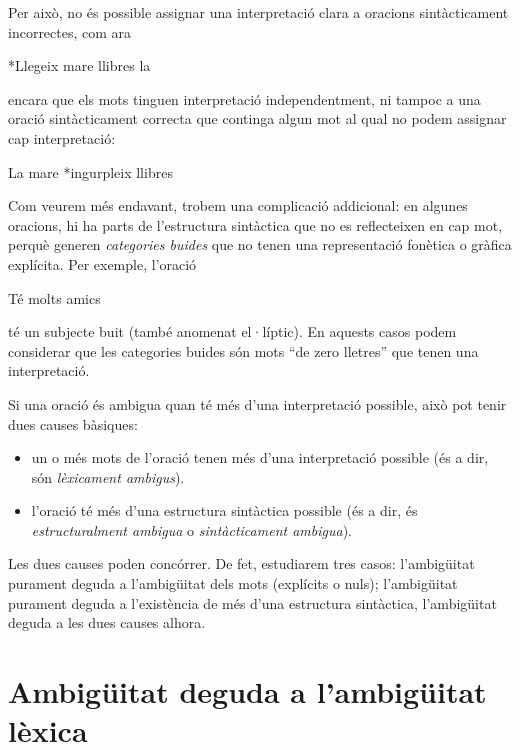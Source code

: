 Per això, no és possible assignar una interpretació clara a oracions
sin\-tàc\-ti\-ca\-ment incorrectes, com ara
\begin{exemple}
*Llegeix mare llibres la
\end{exemple} 
encara que els mots tinguen interpretació independentment, ni
tampoc a una oració sintàcticament correcta que continga algun mot al
qual no podem assignar cap interpretació:
\begin{exemple}
 La mare *ingurpleix llibres
\end{exemple}
Com veurem més endavant, trobem una complicació addicional: en algunes
oracions, hi ha parts de l'estructura sintàctica que no
es reflecteixen en cap mot, perquè generen \emph{categories buides} que
no tenen una representació fonètica o gràfica explícita.  Per exemple,
l'oració 
\begin{exemple}
Té molts amics
\end{exemple} té un subjecte buit (també anomenat
el·líptic). En aquests casos podem considerar que les categories
buides són mots ``de zero lletres'' que tenen una interpretació.

Si una oració és ambigua quan té més d'una interpretació possible, això
pot tenir dues causes bàsiques:
\begin{itemize}
\item un o més mots de l'oració tenen més d'una interpretació possible
  (és a dir, són \emph{lèxicament ambigus}).
\item l'oració té més d'una estructura sintàctica possible (és a dir,
  és \emph{estructuralment ambigua} o \emph{sintàcticament ambigua}).
\end{itemize}
Les dues causes poden concórrer. De fet, estudiarem tres casos:
l'ambigüitat purament deguda a l'ambigüitat dels mots (explícits o
nuls); l'ambigüitat purament deguda a l'existència de més d'una
estructura sintàctica, l'ambigüitat deguda a les dues causes alhora.




\section{Ambigüitat  deguda a l'ambigüitat lèxica}
\label{ss:amblex}


